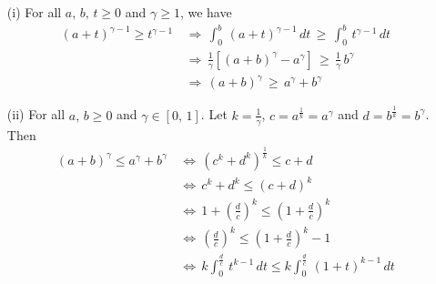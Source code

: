 \documentclass[a4paper,11pt]{article}
\begin{document}
\begin{enumerate}
	\item [(i)]
		For all $a,\,b,\,t \geq 0$ and $\gamma \geq 1$, we have
			$$\begin{aligned}
			(a + t)^{\gamma - 1} \geq t^{\gamma - 1}\,
			&\Rightarrow\, \int_0^b\,(a + t)^{\gamma - 1}\,dt\,
			\geq\,\int_0^b\,t^{\gamma - 1}\,dt\\
			&\Rightarrow\,\frac{1}{\gamma}\left[(a + b)^\gamma - a^\gamma \right]\,\geq\,\frac{1}{\gamma}\,b^\gamma\\
			&\Rightarrow\,(a + b)^\gamma\,\geq\,a^\gamma + b^\gamma
			\end{aligned}$$

	\item [(ii)]
		For all $a,\,b \geq 0$ and $\gamma \in [0,\,1]$. Let $k = \frac{1}{\gamma}$, $c = a^{\frac{1}{k}} = a^\gamma$ and $d = b^{\frac{1}{k}} = b^\gamma$. Then
			$$\begin{aligned}
			(a + b)^\gamma \leq a^\gamma + b^\gamma\,
			&\Leftrightarrow\,
			(c^k + d^k)^{\frac{1}{k}} \leq c + d\\
			&\Leftrightarrow\,
			c^k + d^k \leq (c + d)^k\\
			&\Leftrightarrow\,
			1 + \left(\frac{d}{c}\right)^k \leq \left( 1 + \frac{d}{c} \right)^k\\
			&\Leftrightarrow\,
			\left(\frac{d}{c}\right)^k \leq \left(1 + \frac{d}{c} \right)^k - 1\\
			&\Leftrightarrow\,
			k \int_{0}^{\frac{d}{c}}\,t^{k - 1}\,dt \leq k \int_0^{\frac{d}{c}}\,(1 + t)^{k - 1}\,dt
			\end{aligned}$$
\end{enumerate}


			
\end{document}
